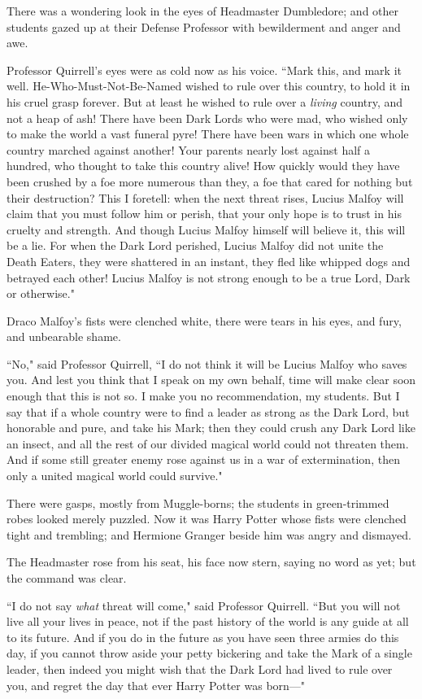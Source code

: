 There was a wondering look in the eyes of Headmaster Dumbledore; and other students gazed up at their Defense Professor with bewilderment and anger and awe.

Professor Quirrell's eyes were as cold now as his voice. ``Mark this, and mark it well. He-Who-Must-Not-Be-Named wished to rule over this country, to hold it in his cruel grasp forever. But at least he wished to rule over a \emph{living} country, and not a heap of ash! There have been Dark Lords who were mad, who wished only to make the world a vast funeral pyre! There have been wars in which one whole country marched against another! Your parents nearly lost against half a hundred, who thought to take this country alive! How quickly would they have been crushed by a foe more numerous than they, a foe that cared for nothing but their destruction? This I foretell: when the next threat rises, Lucius Malfoy will claim that you must follow him or perish, that your only hope is to trust in his cruelty and strength. And though Lucius Malfoy himself will believe it, this will be a lie. For when the Dark Lord perished, Lucius Malfoy did not unite the Death Eaters, they were shattered in an instant, they fled like whipped dogs and betrayed each other! Lucius Malfoy is not strong enough to be a true Lord, Dark or otherwise."

Draco Malfoy's fists were clenched white, there were tears in his eyes, and fury, and unbearable shame.

``No," said Professor Quirrell, ``I do not think it will be Lucius Malfoy who saves you. And lest you think that I speak on my own behalf, time will make clear soon enough that this is not so. I make you no recommendation, my students. But I say that if a whole country were to find a leader as strong as the Dark Lord, but honorable and pure, and take his Mark; then they could crush any Dark Lord like an insect, and all the rest of our divided magical world could not threaten them. And if some still greater enemy rose against us in a war of extermination, then only a united magical world could survive."

There were gasps, mostly from Muggle-borns; the students in green-trimmed robes looked merely puzzled. Now it was Harry Potter whose fists were clenched tight and trembling; and Hermione Granger beside him was angry and dismayed.

The Headmaster rose from his seat, his face now stern, saying no word as yet; but the command was clear.

``I do not say \emph{what} threat will come," said Professor Quirrell. ``But you will not live all your lives in peace, not if the past history of the world is any guide at all to its future. And if you do in the future as you have seen three armies do this day, if you cannot throw aside your petty bickering and take the Mark of a single leader, then indeed you might wish that the Dark Lord had lived to rule over you, and regret the day that ever Harry Potter was born---"

